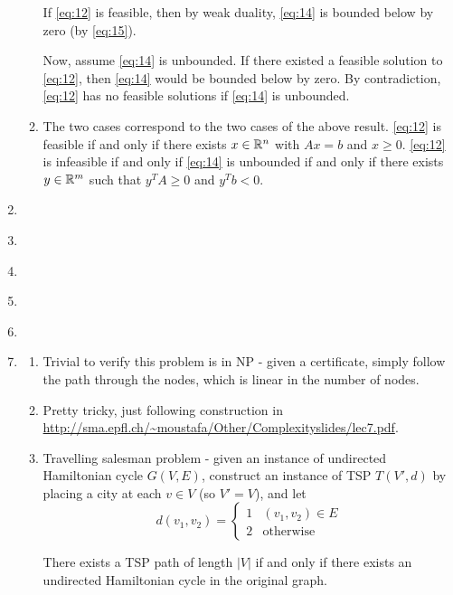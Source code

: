 \begin{enumerate}
\begin{enumerate}
    If \eqref{eq:12} is feasible, then by weak duality, \eqref{eq:14}
    is bounded below by zero (by \eqref{eq:15}).

    Now, assume \eqref{eq:14} is unbounded.  If there existed a
    feasible solution to \eqref{eq:12}, then \eqref{eq:14} would be
    bounded below by zero. By contradiction, \eqref{eq:12} has no
    feasible solutions if \eqref{eq:14} is unbounded.
  \item The two cases correspond to the two cases of the above result.
    \eqref{eq:12} is feasible if and only if there exists $x \in
    \mathbb{R}^{n}$ with $Ax = b$ and $x \geq 0$. \eqref{eq:12} is infeasible
    if and only if \eqref{eq:14} is unbounded if and only if there
    exists $y \in \mathbb{R}^{m}$ such that $y^{T}A \geq 0$ and $y^{T}b < 0$.
  \end{enumerate}
\item \label{item:6}
  
  
\item \label{item:7}
  
\item \label{item:8}

\item \label{item:9}
  
\item \label{item:10}
\item \label{item:11}
  \begin{enumerate}
  \item
    Trivial to verify this problem is in NP - given a certificate,
    simply follow the path through the nodes, which is linear in the
    number of nodes.
  \item
    Pretty tricky, just following construction in
    \url{http://sma.epfl.ch/~moustafa/Other/Complexityslides/lec7.pdf}.
  \item
    Travelling salesman problem - given an instance of undirected
    Hamiltonian cycle $G(V, E)$, construct an instance of TSP $T(V', d)$ by
    placing a city at each $v \in V$ (so $V' = V$), and let
    \begin{equation}
      \label{eq:1}
      d(v_{1}, v_{2}) =
      \begin{cases}
        1 & (v_{1}, v_{2}) \in E \\
        2 & \text{otherwise}
      \end{cases}
    \end{equation}

    There exists a TSP path of length $|V|$ if and only if there exists an
    undirected Hamiltonian cycle in the original graph.


\end{enumerate}
\end{enumerate}
